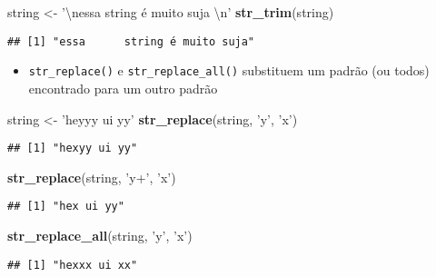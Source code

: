 \documentclass[]{book}
\newenvironment{Shaded}{\begin{snugshade}}{\end{snugshade}}
\newcommand{\KeywordTok}[1]{\textcolor[rgb]{0.13,0.29,0.53}{\textbf{{#1}}}}
\newcommand{\CharTok}[1]{\textcolor[rgb]{0.31,0.60,0.02}{{#1}}}
\newcommand{\StringTok}[1]{\textcolor[rgb]{0.31,0.60,0.02}{{#1}}}
\newcommand{\NormalTok}[1]{{#1}}
\providecommand{\tightlist}{%
  \setlength{\itemsep}{0pt}\setlength{\parskip}{0pt}}
\begin{document}
\begin{Shaded}
\begin{Highlighting}[]
\NormalTok{string <-}\StringTok{ '}\CharTok{\textbackslash{}n}\StringTok{essa      string é muito suja       }\CharTok{\textbackslash{}n}\StringTok{'}
\KeywordTok{str_trim}\NormalTok{(string)}
\end{Highlighting}
\end{Shaded}

\begin{verbatim}
## [1] "essa      string é muito suja"
\end{verbatim}

\begin{itemize}
\tightlist
\item
  \texttt{str\_replace()} e \texttt{str\_replace\_all()} substituem um
  padrão (ou todos) encontrado para um outro padrão
\end{itemize}

\begin{Shaded}
\begin{Highlighting}[]
\NormalTok{string <-}\StringTok{ 'heyyy ui yy'}
\KeywordTok{str_replace}\NormalTok{(string, }\StringTok{'y'}\NormalTok{, }\StringTok{'x'}\NormalTok{)}
\end{Highlighting}
\end{Shaded}

\begin{verbatim}
## [1] "hexyy ui yy"
\end{verbatim}

\begin{Shaded}
\begin{Highlighting}[]
\KeywordTok{str_replace}\NormalTok{(string, }\StringTok{'y+'}\NormalTok{, }\StringTok{'x'}\NormalTok{)}
\end{Highlighting}
\end{Shaded}

\begin{verbatim}
## [1] "hex ui yy"
\end{verbatim}

\begin{Shaded}
\begin{Highlighting}[]
\KeywordTok{str_replace_all}\NormalTok{(string, }\StringTok{'y'}\NormalTok{, }\StringTok{'x'}\NormalTok{)}
\end{Highlighting}
\end{Shaded}

\begin{verbatim}
## [1] "hexxx ui xx"
\end{verbatim}
\end{document}
